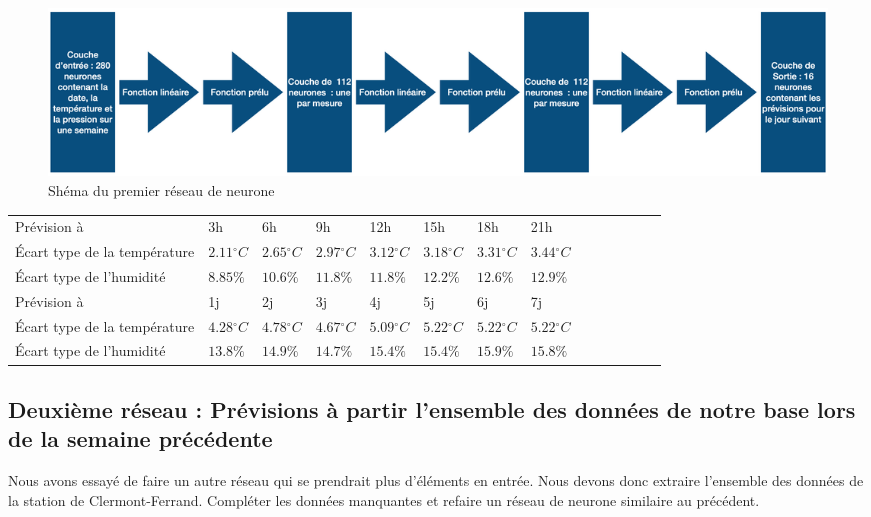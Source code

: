 \documentclass[11pt,a4paper]{article}
\begin{document}
\begin{figure} [H]
\centering
\includegraphics[width=1 \textwidth]{./imagesTIPE/schemaRN.png}
\caption{\label{fig:schemaRN} Shéma du premier réseau de neurone}
\end{figure}



\begin{tabular}{llllllllllllll} 
\hline
\hline
Prévision à                  &3h                         &6h                        &9h                           &12h                         &15h                          &18h          &         21h      \\
Écart type de la température& $2.11{}^{\circ}C$& $2.65{}^{\circ}C$& $2.97{}^{\circ}C$& $3.12{}^{\circ}C$& $3.18{}^{\circ}C$& $3.31{}^{\circ}C$&$3.44{}^{\circ}C$ \\
Écart type de l'humidité &$8.85\%$ & $10.6\%$ & $11.8\%$ & $11.8\%$ & $12.2\%$ & $12.6\%$ & $12.9\%$  \\
\hline
Prévision à                  & 1j &           2j            &3j            &4j          &5j            & 6j & 7j \\
Écart type de la température & $4.28{}^{\circ}C$ & $4.78{}^{\circ}C$ & $4.67{}^{\circ}C$ & $5.09{}^{\circ}C$ & $5.22{}^{\circ}C$ & $5.22{}^{\circ}C$  & $5.22{}^{\circ}C$ \\
Écart type de l'humidité      & $13.8\%$ &  $ 14.9\% $    &  $ 14.7\% $         &  $ 15.4\% $        &  $ 15.4\% $         &  $ 15.9\% $  &  $ 15.8\% $  \\
\hline 
\end{tabular}



\subsection {Deuxième réseau : Prévisions à partir l'ensemble des données de notre base lors de la semaine précédente}

Nous avons essayé de faire un autre réseau qui se prendrait plus d'éléments en entrée.
Nous devons donc extraire l'ensemble des données de la station de Clermont-Ferrand. Compléter les données manquantes et refaire un réseau de neurone similaire au précédent.
\end{document}
